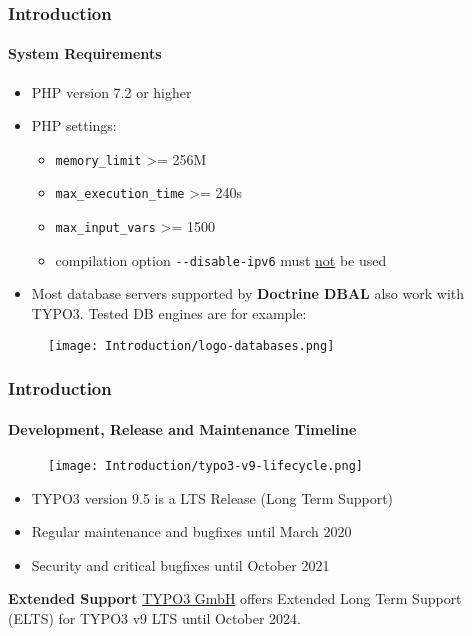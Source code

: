 \begin{frame}[fragile]
	\frametitle{Introduction}
	\framesubtitle{System Requirements}

	\begin{itemize}
		\item PHP version 7.2 or higher
		\item PHP settings:

			\begin{itemize}
				\item \texttt{memory\_limit} >= 256M
				\item \texttt{max\_execution\_time} >= 240s
				\item \texttt{max\_input\_vars} >= 1500
				\item compilation option \texttt{-}\texttt{-disable-ipv6} must \underline{not} be used
			\end{itemize}

		\item Most database servers supported by \textbf{Doctrine DBAL} also work with TYPO3.
			Tested DB engines are for example:
	\end{itemize}

	\begin{figure}
		\texttt{[image: Introduction/logo-databases.png]}
	\end{figure}

\end{frame}


\begin{frame}[fragile]
	\frametitle{Introduction}
	\framesubtitle{Development, Release and Maintenance Timeline}

	\begin{figure}
		\texttt{[image: Introduction/typo3-v9-lifecycle.png]}
	\end{figure}

	\begin{itemize}
		\item TYPO3 version 9.5 is a LTS Release (Long Term Support)
		\item Regular maintenance and bugfixes until March 2020
		\item Security and critical bugfixes until October 2021
	\end{itemize}
	\vspace{0.2cm}
	\textbf{Extended Support}\newline
	\smaller
		\href{https://typo3.com}{TYPO3 GmbH} offers Extended Long Term
			Support (ELTS) for TYPO3 v9 LTS until October 2024.
	\normalsize

\end{frame}

